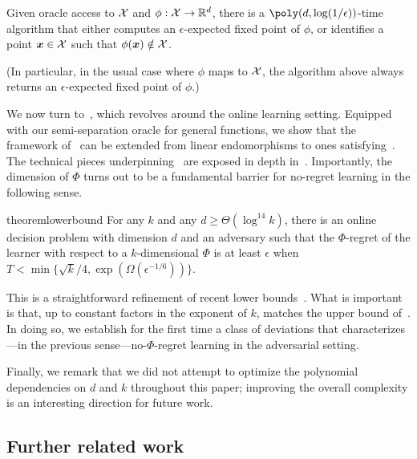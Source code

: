 \begin{theorem}
    Given oracle access to ${\mathcal{X}}$ and $\phi : {\mathcal{X}} \to \mathbb R^d$, there is a $\poly(d, \log(1/\epsilon))$-time algorithm that either computes an $\epsilon$-expected fixed point of $\phi$, or identifies a point ${\bm{x}} \in {\mathcal{X}}$ such that $\phi({\bm{x}}) \notin {\mathcal{X}}$.
\end{theorem}

(In particular, in the usual case where $\phi$ maps to ${\mathcal{X}}$, the algorithm above always returns an $\epsilon$-expected fixed point of $\phi$.)

We now turn to~, which revolves around the online learning setting. Equipped with our semi-separation oracle for general functions, we show that the framework of~\citet{Daskalakis24:Efficient} can be extended from linear endomorphisms to ones satisfying~. The technical pieces underpinning~ are exposed in depth in~. Importantly, the dimension of $\Phi$ turns out to be a fundamental barrier for no-regret learning in the following sense.

\begin{restatable}{theorem}{lowerbound}
    \label{theorem:mainlower}
    For any $k$ and any $d \ge \Theta(\log^{14} k)$, there is an online decision problem with dimension $d$ and an adversary such that the $\Phi$-regret of the learner with respect to a $k$-dimensional $\Phi$ is at least $\epsilon$ when $T < \min \{ \sqrt{k}/4, \exp(\Omega(\epsilon^{-1/6})) \}$.
\end{restatable}

This is a straightforward refinement of recent lower bounds~\citep{Daskalakis24:Lower,Dagan24:From,Peng24:Fast}. What is important is that, up to constant factors in the exponent of $k$,  matches the upper bound of~. In doing so, we establish for the first time a class of deviations that characterizes---in the previous sense---no-$\Phi$-regret learning in the adversarial setting.

Finally, we remark that we did not attempt to optimize the polynomial dependencies on $d$ and $k$ throughout this paper; improving the overall complexity is an interesting direction for future work.

\subsection{Further related work}
\label{sec:related}


